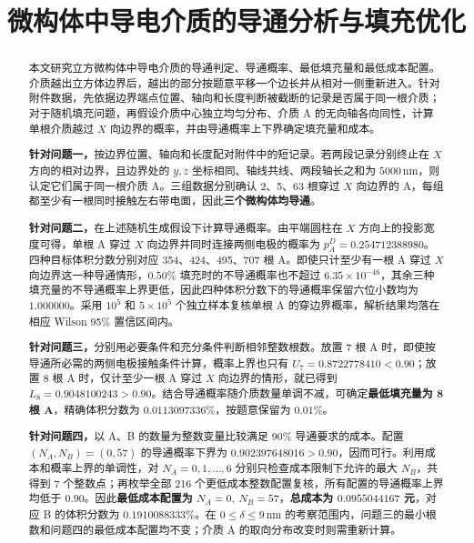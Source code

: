 \documentclass[withoutpreface,bwprint]{cumcmthesis}
\title{微构体中导电介质的导通分析与填充优化}
\begin{document}
\maketitle

\begin{abstract}
本文研究立方微构体中导电介质的导通判定、导通概率、最低填充量和最低成本配置。介质越出立方体边界后，越出的部分按题意平移一个边长并从相对一侧重新进入。针对附件数据，先依据边界端点位置、轴向和长度判断被截断的记录是否属于同一根介质；对于随机填充问题，再假设介质中心独立均匀分布、介质 A 的无向轴各向同性，计算单根介质越过 $X$ 向边界的概率，并由导通概率上下界确定填充量和成本。

\textbf{针对问题一，}按边界位置、轴向和长度配对附件中的短记录。若两段记录分别终止在 $X$ 方向的相对边界，且边界处的 $y,z$ 坐标相同、轴线共线、两段轴长之和为 $5000\,\mathrm{nm}$，则认定它们属于同一根介质 A。三组数据分别确认 2、5、63 根穿过 $X$ 向边界的 A，每组都至少有一根同时接触左右带电面，因此\textbf{三个微构体均导通}。

\textbf{针对问题二，}在上述随机生成假设下计算导通概率。由平端圆柱在 $X$ 方向上的投影宽度可得，单根 A 穿过 $X$ 向边界并同时连接两侧电极的概率为 $p_A^D=0.254712388980$。四种目标体积分数分别对应 354、424、495、707 根 A。即使只计至少有一根 A 穿过 $X$ 向边界这一种导通情形，$0.50\%$ 填充时的不导通概率也不超过 $6.35\times10^{-46}$，其余三种填充量的不导通概率上界更低，因此四种体积分数下的导通概率保留六位小数均为\textbf{$1.000000$}。采用 $10^5$ 和 $5\times10^5$ 个独立样本复核单根 A 的穿边界概率，解析结果均落在相应 Wilson 95\% 置信区间内。

\textbf{针对问题三，}分别用必要条件和充分条件判断相邻整数根数。放置 7 根 A 时，即使按导通所必需的两侧电极接触条件计算，概率上界也只有 $U_7=0.8722778410<0.90$；放置 8 根 A 时，仅计至少一根 A 穿过 $X$ 向边界的情形，就已得到 $L_8=0.9048100243>0.90$。结合导通概率随介质数量单调不减，可确定\textbf{最低填充量为 8 根 A}，精确体积分数为 $0.0113097336\%$，按题意保留为 \textbf{$0.01\%$}。

\textbf{针对问题四，}以 A、B 的数量为整数变量比较满足 $90\%$ 导通要求的成本。配置 $(N_A,N_B)=(0,57)$ 的导通概率下界为 $0.902397648016>0.90$，因而可行。利用成本和概率上界的单调性，对 $N_A=0,1,\ldots,6$ 分别只检查成本限制下允许的最大 $N_B$，共得到 7 个整数点；再枚举全部 216 个更低成本整数配置复核，所有配置的导通概率上界均低于 $0.90$。因此\textbf{最低成本配置为 $N_A=0,\ N_B=57$}，\textbf{总成本为 $0.0955044167$ 元}，对应 B 的体积分数为 $0.1910088333\%$。在 $0\leq\delta\leq9\,\mathrm{nm}$ 的考察范围内，问题三的最小根数和问题四的最低成本配置均不变；介质 A 的取向分布改变时则需重新计算。
\end{abstract}
\end{document}
